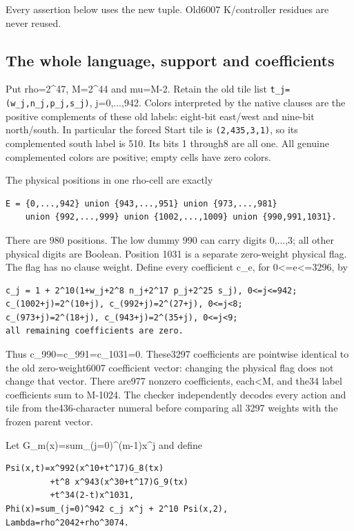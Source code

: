 Every assertion below uses the new tuple. Old6007 K/controller residues are never reused.

\subsection{The whole language, support and coefficients}
Put rho=2\textasciicircum{}47, M=2\textasciicircum{}44 and mu=M-2. Retain the old tile list \texttt{t\_j=(w\_j,n\_j,p\_j,s\_j)}, j=0,...,942. Colors interpreted by the native clauses are the positive complements of these old labels: eight-bit east/west and nine-bit north/south. In particular the forced Start tile is \texttt{(2,435,3,1)}, so its complemented south label is 510. Its bits 1 through8 are all one. All genuine complemented colors are positive; empty cells have zero colors.

The physical positions in one rho-cell are exactly

\begin{Verbatim}[fontsize=\small,breaklines=true,breakanywhere=true,breaksymbolleft={}]
E = {0,...,942} union {943,...,951} union {973,...,981}
    union {992,...,999} union {1002,...,1009} union {990,991,1031}.
\end{Verbatim}

There are 980 positions. The low dummy 990 can carry digits 0,...,3; all other physical digits are Boolean. Position 1031 is a separate zero-weight physical flag. The flag has no clause weight. Define every coefficient c\_e, for 0<=e<=3296, by

\begin{Verbatim}[fontsize=\small,breaklines=true,breakanywhere=true,breaksymbolleft={}]
c_j = 1 + 2^10(1+w_j+2^8 n_j+2^17 p_j+2^25 s_j), 0<=j<=942;
c_(1002+j)=2^(10+j), c_(992+j)=2^(27+j), 0<=j<8;
c_(973+j)=2^(18+j), c_(943+j)=2^(35+j), 0<=j<9;
all remaining coefficients are zero.
\end{Verbatim}

Thus c\_990=c\_991=c\_1031=0. These3297 coefficients are pointwise identical to the old zero-weight6007 coefficient vector: changing the physical flag does not change that vector. There are977 nonzero coefficients, each<M, and the34 label coefficients sum to M-1024. The checker independently decodes every action and tile from the436-character numeral before comparing all 3297 weights with the frozen parent vector.

Let G\_m(x)=sum\_(j=0)\textasciicircum{}(m-1)x\textasciicircum{}j and define

\begin{Verbatim}[fontsize=\small,breaklines=true,breakanywhere=true,breaksymbolleft={}]
Psi(x,t)=x^992(x^10+t^17)G_8(tx)
         +t^8 x^943(x^30+t^17)G_9(tx)
         +t^34(2-t)x^1031,
Phi(x)=sum_(j=0)^942 c_j x^j + 2^10 Psi(x,2),
Lambda=rho^2042+rho^3074.
\end{Verbatim}

